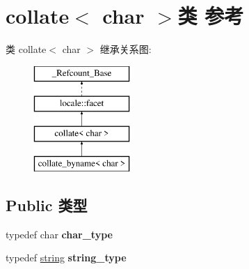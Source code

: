 \hypertarget{classcollate_3_01char_01_4}{}\section{collate$<$ char $>$类 参考}
\label{classcollate_3_01char_01_4}
类 collate$<$ char $>$ 继承关系图\+:\begin{figure}[H]
\begin{center}
\leavevmode
\includegraphics[height=4.000000cm]{classcollate_3_01char_01_4}
\end{center}
\end{figure}
\subsection*{Public 类型}
\begin{DoxyCompactItemize}
\item 
\mbox{\label{classcollate_3_01char_01_4_ade0969b9895dd7065b01c4e3129676cf}} 
typedef char {\bfseries char\+\_\+type}
\item 
\mbox{\label{classcollate_3_01char_01_4_a3d43299738cf05f36f0163c6f79f2bcd}} 
typedef \hyperlink{structstring}{string} {\bfseries string\+\_\+type}
\end{DoxyCompactItemize}
